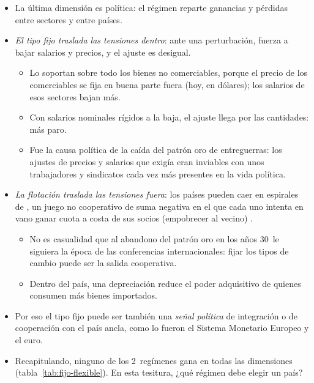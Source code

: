 \documentclass[11pt]{article}
\begin{document}
\begin{itemize}
\item La última dimensión es política: el régimen reparte ganancias y pérdidas entre sectores y entre países\nocite{Frieden2015Currency}.
\item \emph{El tipo fijo traslada las tensiones dentro}: ante una perturbación, fuerza a bajar salarios y precios, y el ajuste es desigual.
  \begin{itemize}
  \item Lo soportan sobre todo los bienes no comerciables, porque el precio de los comerciables se fija en buena parte fuera (hoy, en dólares); los salarios de esos sectores bajan más.
  \item Con salarios nominales rígidos a la baja, el ajuste llega por las cantidades: más paro\nocite{SchmittGroheUribe2016Downward}.
  \item Fue la causa política de la caída del patrón oro de entreguerras: los ajustes de precios y salarios que exigía eran inviables con unos trabajadores y sindicatos cada vez más presentes en la vida política.
  \end{itemize}
\item \emph{La flotación traslada las tensiones fuera}: los países pueden caer en espirales de , un juego no cooperativo de suma negativa en el que cada uno intenta en vano ganar cuota a costa de sus socios (empobrecer al vecino) .
  \begin{itemize}
  \item No es casualidad que al abandono del patrón oro en los años 30~le siguiera la época de las conferencias internacionales: fijar los tipos de cambio puede ser la salida cooperativa.
  \item Dentro del país, una depreciación reduce el poder adquisitivo de quienes consumen más bienes importados.
  \end{itemize}
\item Por eso el tipo fijo puede ser también una \emph{señal política} de integración o de cooperación con el país ancla, como lo fueron el Sistema Monetario Europeo y el euro.
\item Recapitulando, ninguno de los 2~regímenes gana en todas las dimensiones (tabla~\ref{tab:fijo-flexible}). En esta tesitura, ¿qué régimen debe elegir un país?
\end{itemize}
\end{document}
